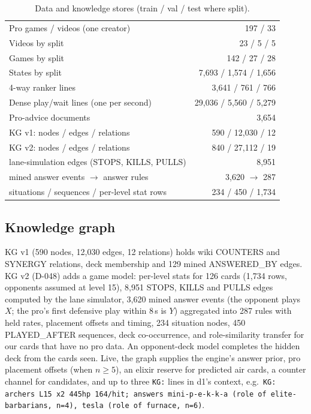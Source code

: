 \documentclass[conference]{IEEEtran}
\newcommand{\tw}[1]{\texttt{#1}}
\begin{document}
\begin{table}[t]
\caption{Data and knowledge stores (train / val / test where split).}
\label{tab:data}
\centering\footnotesize
\setlength{\tabcolsep}{4pt}
\begin{tabular}{@{}lr@{}}
\toprule
Pro games / videos (one creator) & 197 / 33\\
Videos by split & 23 / 5 / 5\\
Games by split & 142 / 27 / 28\\
States by split & 7,693 / 1,574 / 1,656\\
4-way ranker lines & 3,641 / 761 / 766\\
Dense play/wait lines (one per second) & 29,036 / 5,560 / 5,279\\
Pro-advice documents & 3,654\\
\midrule
KG v1: nodes / edges / relations & 590 / 12,030 / 12\\
KG v2: nodes / edges / relations & 840 / 27,112 / 19\\
\quad lane-simulation edges (STOPS, KILLS, PULLS) & 8,951\\
\quad mined answer events $\rightarrow$ answer rules & 3,620 $\rightarrow$ 287\\
\quad situations / sequences / per-level stat rows & 234 / 450 / 1,734\\
\bottomrule
\end{tabular}
\end{table}

\subsection{Knowledge graph}
KG v1 (590 nodes, 12,030 edges, 12 relations) holds wiki COUNTERS and SYNERGY relations, deck membership and 129 mined ANSWERED\_BY edges. KG v2 (D-048) adds a game model: per-level stats for 126 cards (1,734 rows, opponents assumed at level 15), 8,951 STOPS, KILLS and PULLS edges computed by the lane simulator, 3,620 mined answer events (the opponent plays $X$; the pro's first defensive play within 8\,s is $Y$) aggregated into 287 rules with held rates, placement offsets and timing, 234 situation nodes, 450 PLAYED\_AFTER sequences, deck co-occurrence, and role-similarity transfer for our cards that have no pro data. An opponent-deck model completes the hidden deck from the cards seen. %
Live, the graph supplies the engine's answer prior, pro placement offsets (when $n\ge5$), an elixir reserve for predicted air cards, a counter channel for candidates, and up to three \tw{KG:} lines in d1's context, e.g.\ \tw{KG: archers L15 x2 445hp 164/hit; answers mini-p-e-k-k-a (role of elite-barbarians, n=4), tesla (role of furnace, n=6)}. %
\end{document}

